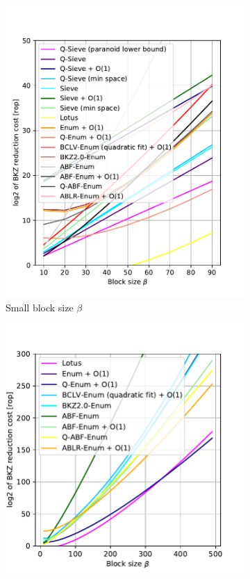 \begin{figure}[h!]
    \begin{subfigure}{0.49\textwidth}
        \centering
        \includegraphics[width=1\textwidth]{graphics/cost_models_small_beta.pdf}
        \caption{Small block size $\beta$}\label{fig:costmodels-small-beta}
    \end{subfigure}
    \begin{subfigure}{0.5\textwidth}
        \centering
        \includegraphics[width=1\textwidth]{graphics/cost_models_enum.pdf}

\end{subfigure}
\end{figure}
